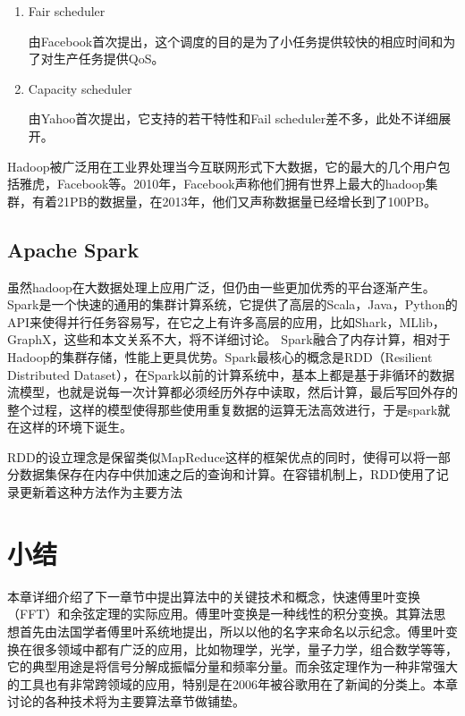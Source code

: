 \begin{enumerate}
\item Fair scheduler

由Facebook首次提出，这个调度的目的是为了小任务提供较快的相应时间和为了对生产任务提供QoS。
\item Capacity scheduler

由Yahoo首次提出，它支持的若干特性和Fail scheduler差不多，此处不详细展开。
\end{enumerate}

Hadoop被广泛用在工业界处理当今互联网形式下大数据，它的最大的几个用户包括雅虎，Facebook等。2010年，Facebook声称他们拥有世界上最大的hadoop集群，有着21PB的数据量，在2013年，他们又声称数据量已经增长到了100PB。

\subsection{Apache Spark}
虽然hadoop在大数据处理上应用广泛，但仍由一些更加优秀的平台逐渐产生。
Spark是一个快速的通用的集群计算系统，它提供了高层的Scala，Java，Python的API来使得并行任务容易写，在它之上有许多高层的应用，比如Shark，MLlib，GraphX，这些和本文关系不大，将不详细讨论。
Spark融合了内存计算，相对于Hadoop的集群存储，性能上更具优势。Spark最核心的概念是RDD（Resilient Distributed Dataset），在Spark以前的计算系统中，基本上都是基于非循环的数据流模型，也就是说每一次计算都必须经历外存中读取，然后计算，最后写回外存的整个过程，这样的模型使得那些使用重复数据的运算无法高效进行，于是spark就在这样的环境下诞生。

RDD的设立理念是保留类似MapReduce这样的框架优点的同时，使得可以将一部分数据集保存在内存中供加速之后的查询和计算。在容错机制上，RDD使用了记录更新着这种方法作为主要方法
\section{小结}
\label{sec:conc}

本章详细介绍了下一章节中提出算法中的关键技术和概念，快速傅里叶变换（FFT）和余弦定理的实际应用。傅里叶变换是一种线性的积分变换。其算法思想首先由法国学者傅里叶系统地提出，所以以他的名字来命名以示纪念。傅里叶变换在很多领域中都有广泛的应用，比如物理学，光学，量子力学，组合数学等等，它的典型用途是将信号分解成振幅分量和频率分量。而余弦定理作为一种非常强大的工具也有非常跨领域的应用，特别是在2006年被谷歌用在了新闻的分类上。本章讨论的各种技术将为主要算法章节做铺垫。
